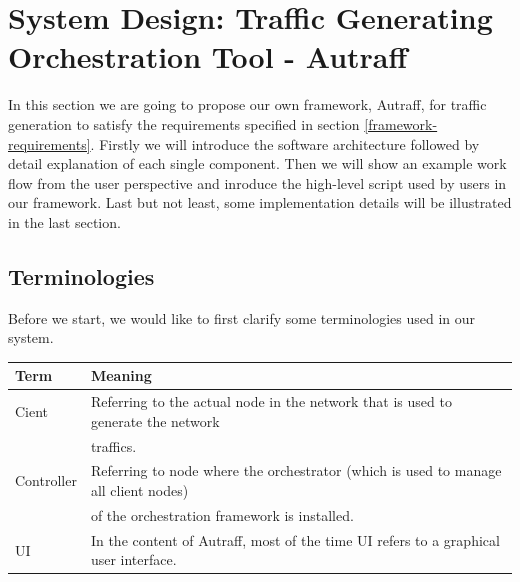 \documentclass[12pt]{report}
\begin{document}
\chapter{System Design: Traffic Generating Orchestration Tool - Autraff} \label{sd}

In this section we are going to propose our own framework, Autraff, for traffic generation to satisfy the requirements specified in section \ref{framework-requirements}. Firstly we will introduce the software architecture followed by detail explanation of each single component. Then we will show an example work flow from the user perspective and inroduce the high-level script used by users in our framework. Last but not least, some implementation details will be illustrated in the last section.

\section{Terminologies}
Before we start, we would like to first clarify some terminologies used in our system.\\

\setlength{\parindent}{0pt}
\begin{tabular}{ | l | l |}
\hline
\textbf{Term} & \textbf{Meaning} \\
\hline
Cient & Referring to the actual node in the network that is used to generate the network \\ & traffics. \\
\hline
Controller & Referring to node where the orchestrator (which is used to manage all client nodes) \\ &  of the orchestration framework is installed. \\
\hline
UI & In the content of Autraff, most of the time UI refers to a graphical user interface. \\
\hline

\end{tabular}
\end{document}
